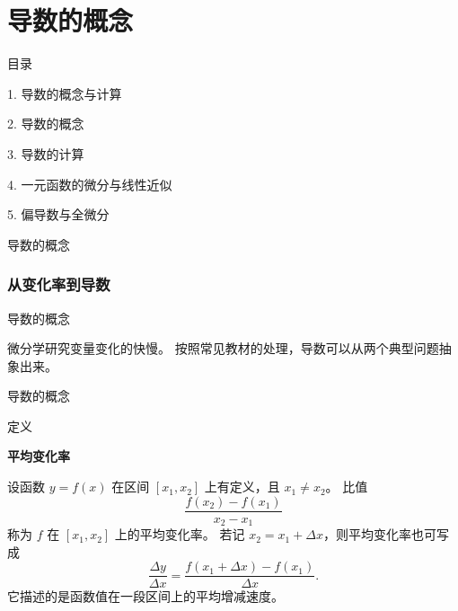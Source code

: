 \documentclass[aspectratio=169,10pt,fontset=fandol]{ctexbeamer}
\begin{document}
\section{导数的概念}
\begin{frame}[t,fragile]{目录}
\normalsize
{\color{black}\normalsize 1. 导数的概念与计算\par}\vspace{0.22em}
{\color{blue}\normalsize 2. 导数的概念\par}\vspace{0.22em}
{\color{gray!40}\normalsize 3. 导数的计算\par}\vspace{0.22em}
{\color{gray!40}\normalsize 4. 一元函数的微分与线性近似\par}\vspace{0.22em}
{\color{gray!40}\normalsize 5. 偏导数与全微分\par}\vspace{0.22em}
\end{frame}
\begin{frame}[t,fragile]{导数的概念}
\footnotesize
{\footnotesize

\subsubsection*{从变化率到导数}


}
\end{frame}
\begin{frame}[t,fragile]{导数的概念}
\footnotesize
{\footnotesize
微分学研究变量变化的快慢。 按照常见教材的处理，导数可以从两个典型问题抽象出来。


}
\end{frame}
\begin{frame}[t,fragile]{导数的概念}
\footnotesize
\begin{block}{定义}
{\footnotesize
\textbf{平均变化率}\par

设函数 $y=f(x)$ 在区间 $[x_1,x_2]$ 上有定义，且 $x_1\neq x_2$。 比值
\[
\frac{f(x_2)-f(x_1)}{x_2-x_1}
\]
称为 $f$ 在 $[x_1,x_2]$ 上的平均变化率。 若记 $x_2=x_1+\Delta x$，则平均变化率也可写成
\[
\frac{\Delta y}{\Delta x}
=\frac{f(x_1+\Delta x)-f(x_1)}{\Delta x}.
\]
它描述的是函数值在一段区间上的平均增减速度。

}
\end{block}
\end{frame}
\end{document}
